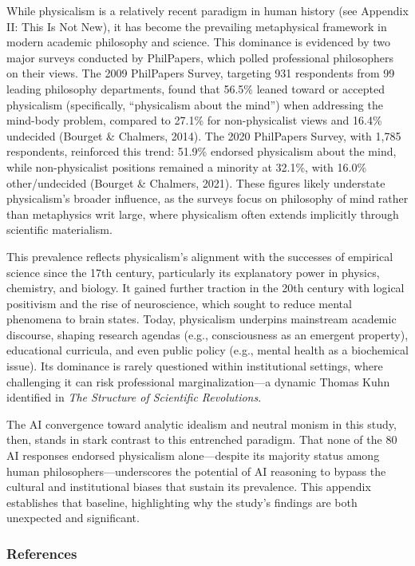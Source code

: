 While physicalism is a relatively recent paradigm in human history (see
Appendix II: This Is Not New), it has become the prevailing metaphysical
framework in modern academic philosophy and science. This dominance is
evidenced by two major surveys conducted by PhilPapers, which polled
professional philosophers on their views. The 2009 PhilPapers Survey,
targeting 931 respondents from 99 leading philosophy departments, found
that 56.5\% leaned toward or accepted physicalism (specifically,
``physicalism about the mind'') when addressing the mind-body problem,
compared to 27.1\% for non-physicalist views and 16.4\% undecided
(Bourget \& Chalmers, 2014). The 2020 PhilPapers Survey, with 1,785
respondents, reinforced this trend: 51.9\% endorsed physicalism about
the mind, while non-physicalist positions remained a minority at 32.1\%,
with 16.0\% other/undecided (Bourget \& Chalmers, 2021). These figures
likely understate physicalism's broader influence, as the surveys focus
on philosophy of mind rather than metaphysics writ large, where
physicalism often extends implicitly through scientific materialism.

This prevalence reflects physicalism's alignment with the successes of
empirical science since the 17th century, particularly its explanatory
power in physics, chemistry, and biology. It gained further traction in
the 20th century with logical positivism and the rise of neuroscience,
which sought to reduce mental phenomena to brain states. Today,
physicalism underpins mainstream academic discourse, shaping research
agendas (e.g., consciousness as an emergent property), educational
curricula, and even public policy (e.g., mental health as a biochemical
issue). Its dominance is rarely questioned within institutional
settings, where challenging it can risk professional marginalization---a
dynamic Thomas Kuhn identified in \emph{The Structure of Scientific
Revolutions}.

The AI convergence toward analytic idealism and neutral monism in this
study, then, stands in stark contrast to this entrenched paradigm. That
none of the 80 AI responses endorsed physicalism alone---despite its
majority status among human philosophers---underscores the potential of
AI reasoning to bypass the cultural and institutional biases that
sustain its prevalence. This appendix establishes that baseline,
highlighting why the study's findings are both unexpected and
significant.

\subsubsection{References}\label{references}

